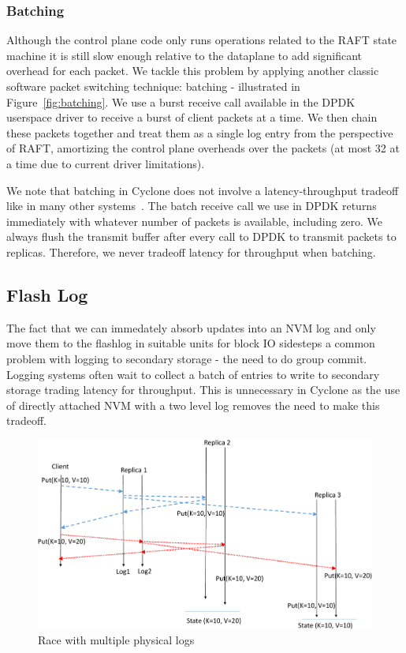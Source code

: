 \documentclass[pageno]{jpaper}
\begin{document}
\subsubsection{Batching}
Although the control plane code only runs operations related to the RAFT state
machine it is still slow enough relative to the dataplane to add significant
overhead for each packet. We tackle this problem by applying another classic
software packet switching technique: batching - illustrated in
Figure~\ref{fig:batching}. We use a burst receive call available in the DPDK
userspace driver to receive a burst of client packets at a time. We then chain
these packets together and treat them as a single log entry from the perspective
of RAFT, amortizing the control plane overheads over the packets (at most 32 at
a time due to current driver limitations).

We note that batching in Cyclone does not involve a latency-throughput
tradeoff like in many other systems~\cite{ix-dataplane}. The batch receive call
we use in DPDK returns immediately with whatever number of packets is available,
including zero. We always flush the transmit buffer after every call to DPDK to
transmit packets to replicas. Therefore, we never tradeoff latency for
throughput when batching. 

\subsection{Flash Log}

The fact that we can immedately absorb updates into an NVM log and only move
them to the flashlog in suitable units for block IO sidesteps a common problem
with logging to secondary storage - the need to do group commit. Logging systems
often wait to collect a batch of entries to write to secondary storage trading
latency for throughput. This is unnecessary in Cyclone as the use of directly
attached NVM with a two level log removes the need to make this tradeoff.

\begin{figure}
  \centering
  \includegraphics[scale=0.35]{figures2/race.pdf}
  \caption{Race with multiple physical logs}
  \label{fig:race}
\end{figure}
\end{document}
